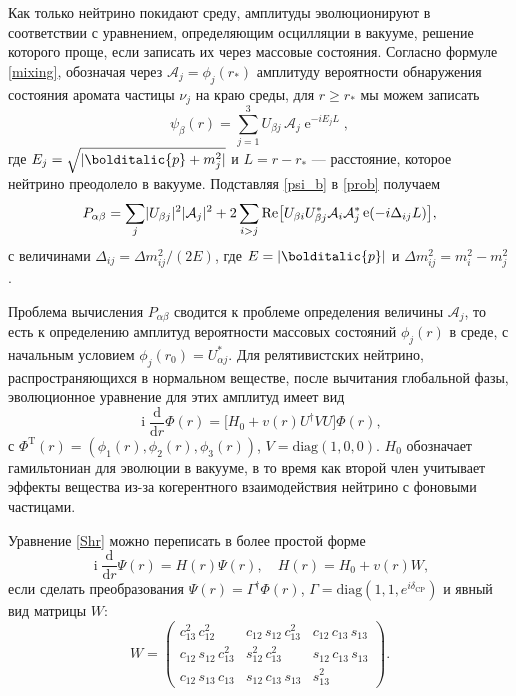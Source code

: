 \documentclass[12pt]{article}
\newcommand\Vect[1]{\bolditalic{#1}}
\DeclareMathOperator{\Exp}{e}
\DeclareMathOperator\Iunit{i}
\DeclarePairedDelimiter{\abs}{\lvert}{\rvert}
\renewcommand\exp\Exp
\renewcommand\imath\Iunit
\begin{document}
Как только нейтрино покидают среду, амплитуды эволюционируют в соответствии с
уравнением, определяющим осцилляции в вакууме, решение которого проще, если
записать их через массовые состояния. Согласно формуле \eqref{mixing}, обозначая
через $\mathcal{A}_j=\phi_j(r_*)$ амплитуду вероятности обнаружения состояния
аромата частицы $\nu_j$ на краю среды, для $r \geqslant r_*$ мы можем записать
\begin{equation}\label{psi_b}
  \psi_\beta(r)=\sum_{j=1}^3 U_{\beta j}\, \mathcal{A}_j \exp^{-iE_jL},
\end{equation}
где $E_j=\sqrt{\abs{\Vect{p} + m^2_j}}$ и $L=r-r_*$ — расстояние, которое нейтрино
преодолело в вакууме. Подставляя \eqref{psi_b} в \eqref{prob} получаем
\begin{equation}
  P_{\alpha\beta}=\sum_j \abs{U_{\beta j}}^2\abs{\mathcal{A}_j}^2+
  2\sum_{i>j}\text{Re}\big[U_{\beta i}U^*_{\beta j}\mathcal{A}_i
  \mathcal{A}^*_j\exp(-i\Delta_{ij}L)\big],
\end{equation}
с величинами $\Delta_{ij}=\Delta m^2_{ij}/(2E)$, где $E=\abs{\Vect{p}}$ и
$\Delta m^2_{ij} \!= m^2_{i} - m^2_{j}$.

Проблема вычисления $P_{\alpha\beta}$ сводится к проблеме определения величины
$\mathcal{A}_j$, то есть к определению амплитуд вероятности массовых состояний
$\phi_j(r)$ в среде, с начальным условием $\phi_j(r_0)=U^*_{\alpha j}$. Для
релятивистских нейтрино, распространяющихся в нормальном веществе, после
вычитания глобальной фазы, эволюционное уравнение для этих амплитуд имеет вид
\begin{equation}\label{Shr}
  \imath\frac{\text{d}}{\text{d}r} \Phi(r)=
  \big[H_0+v(r)U^\dagger V U\big] \Phi(r),
\end{equation}
с $\Phi^{\text{T}}(r)=(\phi_1(r),\phi_2(r),\phi_3(r))$, $V=\text{diag}(1,0,0)$.
$H_0$ обозначает гамильтониан для эволюции в вакууме, в то время как второй член
учитывает эффекты вещества из-за когерентного взаимодействия нейтрино с фоновыми
частицами.

Уравнение \eqref{Shr} можно переписать в более простой форме
\begin{equation}\label{eq:1}
  \imath\frac{\text{d}}{\text{d}r}\Psi(r)=H(r)\Psi(r),\quad
  H(r)=H_0 + v(r)W,
\end{equation}
если сделать преобразования $\Psi(r)=\Gamma^\dagger\Phi(r)$,
$\Gamma=\text{diag}(1,1,e^{i\delta_{\text{CP}}})$ и явный вид матрицы $W$:
\begin{equation}\label{W}
  W=
  \begin{pmatrix}
    c^2_{13}\, c^2_{12}& c_{12}\, s_{12}\, c^2_{13}& c_{12}\, c_{13}\, s_{13}\\
    c_{12}\, s_{12}\, c^2_{13}& s^2_{12}\, c^2_{13}& s_{12}\, c_{13}\, s_{13}\\
    c_{12}\, s_{13}\, c_{13}& s_{12}\, c_{13}\, s_{13}& s^2_{13}
  \end{pmatrix}.
\end{equation}
\end{document}
